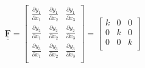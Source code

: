 \documentclass
[
a4paper,                      %
twoside,					  %
12pt,                         %
abstract,		      %
fleqn,                        %
]
{scrartcl} %
\begin{document}
\begin{equation}
\mathbf{\underline{\underline{F}}}=\begin{bmatrix}
\frac{\partial y_{1}}{\partial x_{1}}&\frac{\partial y_{1}}{\partial x_{2}}&\frac{\partial y_{1}}{\partial x_{3}}\\[5pt]
\frac{\partial y_{2}}{\partial x_{1}}&\frac{\partial y_{2}}{\partial x_{2}}&\frac{\partial y_{2}}{\partial x_{3}}\\[5pt]
\frac{\partial y_{3}}{\partial x_{1}}&\frac{\partial y_{3}}{\partial x_{2}}&\frac{\partial y_{3}}{\partial x_{3}}\\[5pt]
\end{bmatrix}=\begin{bmatrix}
k&0&0\\[5pt]
0&k&0\\[5pt]
0&0&k\\[5pt]\end{bmatrix}
\end{equation}
\end{document}
